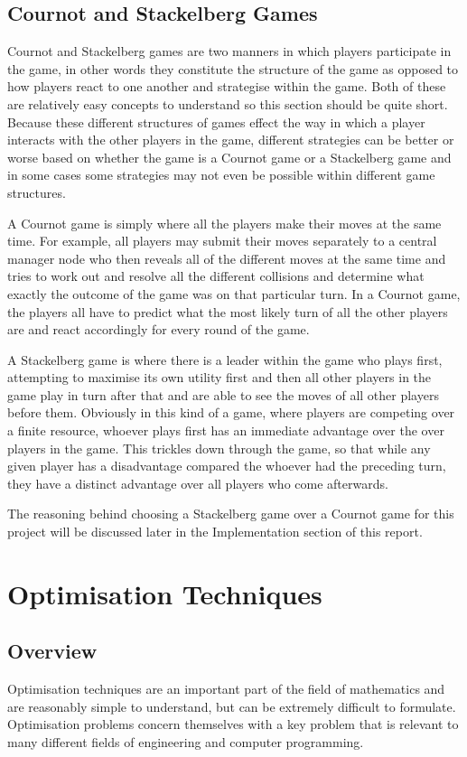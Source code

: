 \documentclass[a4paper, notitlepage]{report}
\begin{document}
\section{Cournot and Stackelberg Games}
\label{sec:org3a256b4}
Cournot and Stackelberg games are two manners in which players participate in
the game, in other words they constitute the structure of the game as opposed to
how players react to one another and strategise within the game. Both of these
are relatively easy concepts to understand so this section should be quite
short. Because these different structures of games effect the way in which a
player interacts with the other players in the game, different strategies can be
better or worse based on whether the game is a Cournot game or a Stackelberg
game and in some cases some strategies may not even be possible within different
game structures.

A Cournot game is simply where all the players make their moves at the same
time. For example, all players may submit their moves separately to a central
manager node who then reveals all of the different moves at the same time and
tries to work out and resolve all the different collisions and determine what
exactly the outcome of the game was on that particular turn. In a Cournot game,
the players all have to predict what the most likely turn of all the other
players are and react accordingly for every round of the game.

A Stackelberg game is where there is a leader within the game who plays first,
attempting to maximise its own utility first and then all other players in the
game play in turn after that and are able to see the moves of all other players
before them. Obviously in this kind of a game, where players are competing over
a finite resource, whoever plays first has an immediate advantage over the over
players in the game. This trickles down through the game, so that while any
given player has a disadvantage compared the whoever had the preceding turn,
they have a distinct advantage over all players who come afterwards.

The reasoning behind choosing a Stackelberg game over a Cournot game for this
project will be discussed later in the Implementation section of this report.
\chapter{Optimisation Techniques}
\label{sec:org193ae3d}
\section{Overview}
\label{sec:org8e46981}
Optimisation techniques are an important part of the field of mathematics and
are reasonably simple to understand, but can be extremely difficult to
formulate. Optimisation problems concern themselves with a key problem that is
relevant to many different fields of engineering and computer programming.
\end{document}
